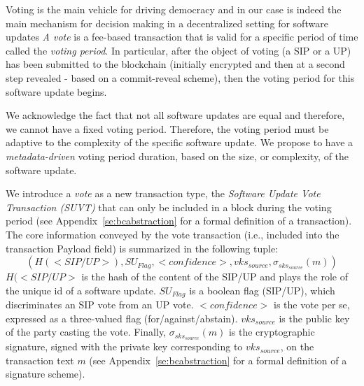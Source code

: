 Voting is the main vehicle for driving democracy and in our case is indeed the main mechanism for decision making in a decentralized setting for software updates
\emph{A vote} is a fee-based transaction that is valid for a specific period of time called the \emph{voting period}. In particular, after the object of voting (a SIP or a UP) has been submitted to the blockchain (initially encrypted and then at a second step revealed - based on a commit-reveal scheme),%
then the voting period for this software update begins. 

We acknowledge the fact that not all software updates are equal and therefore, we cannot have a fixed voting period. %
Therefore, the voting period must be adaptive to the complexity of the specific software update. We propose to have a \emph{metadata-driven} voting period duration, based on the size, or complexity, of the software update.%

We introduce a \emph{vote} as a new transaction type, the \emph{Software Update Vote Transaction (SUVT)} that can only be included in a block during the voting period (see Appendix~\ref{se:bcabstraction} for a formal definition of a transaction). The core information conveyed by the vote transaction (i.e., included into the transaction Payload field) is summarized in the following tuple:
$$( H(<SIP/UP>),SU_{Flag},<confidence>,vks_{source},\sigma_{sks_{source}}(m))$$
$H(<SIP/UP>$ is the hash of the content of the SIP/UP and plays the role of the unique id of a software update. $SU_{Flag}$ is a boolean flag (SIP/UP), which discriminates an SIP vote from an UP vote. $<confidence>$ is the vote per se, expressed as a three-valued flag (for/against/abstain). $vks_{source}$ is the public key of the party casting the vote. Finally, $\sigma_{sks_{source}}(m)$ is the cryptographic signature, signed with the private key corresponding to $vks_{source}$, on the transaction text $m$ (see Appendix~\ref{se:bcabstraction} for a formal definition of a signature scheme).

